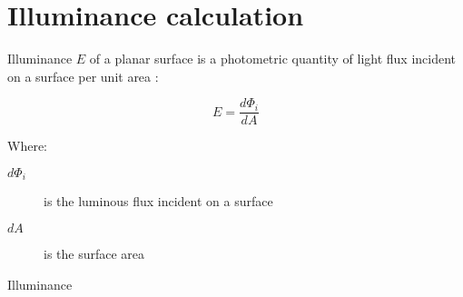 \section{Illuminance calculation}
Illuminance $E$ of a planar surface is a photometric quantity of light flux incident on a surface per unit area \cite{Habel}:

\begin{equation}
E=\frac{d\Phi_{i}}{dA}
\end{equation}

Where:
\begin{description}
	\item[$d\Phi_{i}$] is the luminous flux incident on a surface
	\item[$dA$] is the surface area
\end{description}

Illuminance 